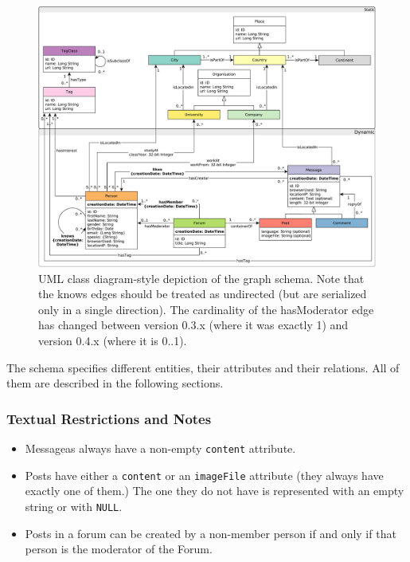 \begin{figure}[htbp]
    \centering
    \includegraphics[scale=\yedscale]{figures/schema-comfortable}
    \caption{UML class diagram-style depiction of the \ldbcsnb graph schema. Note that the \textsf{knows} edges should be treated as undirected (but are serialized only in a single direction). The cardinality of the \textsf{hasModerator} edge has changed between version 0.3.x (where it was exactly 1) and version 0.4.x (where it is 0..1).}
    \label{fig:schema}
\end{figure}

The schema specifies different entities, their attributes and their relations.
All of them are described in the following sections.

\subsubsection*{Textual Restrictions and Notes}
\begin{itemize}
    \item Messageas always have a non-empty \texttt{content} attribute.
    \item Posts have either a \texttt{content} or an \texttt{imageFile} attribute (\ie they always have exactly one of them.) The one they do not have is represented with an empty string or with \texttt{NULL}.
    \item Posts in a forum can be created by a non-member person if and only if that person is the moderator of the Forum.
\end{itemize}

